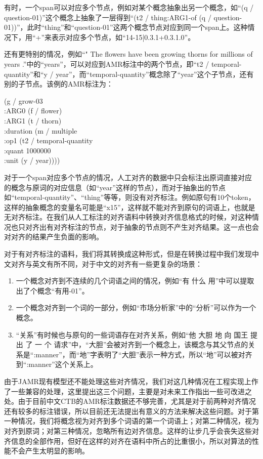 \documentclass[master, winfont]{njuthesis}
\begin{document}
有时，一个span可以对应多个节点，例如对某个概念抽象出另一个概念，如“(q / question-01)”这个概念上抽象了一层得到“(t2 / thing:ARG1-of (q / question-01))”，此时“thing”和“question-01”这两个概念节点对应到同一个span上。这种情况下，用“+”来表示对应多个节点，如“14-15|0.3.1+0.3.1.0”。

还有更特别的情况，例如“" The flowers have been growing thorns for millions of years .”中的“years”，可以对应到AMR标注中的两个节点，即“t2 / temporal-quantity”和“y / year”，而“temporal-quantity”概念除了“year”这个子节点，还有别的子节点。该例的AMR标注为：

(g / grow-03\\
      :ARG0 (f / flower)\\
      :ARG1 (t / thorn)\\
      :duration (m / multiple\\
            :op1 (t2 / temporal-quantity \\
            	  :quant 1000000\\
                  :unit (y / year))))
                        
对于一个span对应多个节点的情况，人工对齐的数据中只会标注出原词直接对应的概念与原词的对应信息（如“year”这样的节点），而对于抽象出的节点如“temporal-quantity”、“thing”等等，则没有对齐标注。例如原句有10个token，这样的抽象概念的变量名可能是“x15”，这样就不能对齐到原句的词语上，也就是无对齐标注。在我们从人工标注的对齐语料中转换对齐信息格式的时候，对这种情况也只对齐出有对齐标注的节点，对于抽象的节点则不产生对齐结果。这一点也会对对齐的结果产生负面的影响。

对于有对齐标注的语料，我们将其转换成这种形式，但是在转换过程中我们发现中文对齐与英文有所不同，对于中文的对齐有一些更复杂的场景：

\begin{enumerate}
	\item 一个概念对齐到不连续的几个词语之间的情况，例如“有 什么 用”中可以提取出了个概念“有用-01”。
	\item 一个概念对齐到一个词的一部分，例如“市场分析家”中的“分析”可以作为一个概念。
	\item “关系”有时候也与原句的一些词语存在对齐关系，例如“他 大胆 地 向 国王 提出 了 一 个 请求”中，“大胆”会被对齐到一个概念上，该概念与其父节点的关系是“:manner”，而“地”字表明了“大胆”表示一种方式，所以“地”可以被对齐到“:manner”这个关系上。
\end{enumerate}

由于JAMR现有模型还不能处理这些对齐情况，我们对这几种情况在工程实现上作了一些兼容的处理，这里提出这三个问题，主要是对未来工作指出一些可改进之处。由于目前中文CTB的AMR标注数据还不够完善，尤其是对于前两种对齐情况还有较多的标注错误，所以目前还无法提出有意义的方法来解决这些问题。对于第一种情况，我们将概念视为对齐到多个词语的第一个词语上；对第二种情况，视为对齐到原词；对第三种情况，忽略所有边对齐信息。这样的让步几乎会丧失这些对齐信息的全部作用，但好在这样的对齐在语料中所占的比重很小，所以对算法的性能不会产生太明显的影响。
\end{document}
